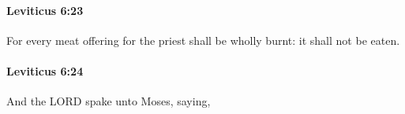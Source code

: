 		\paragraph{Leviticus 6:23} %
			\label{LEVITICUS-6-23}

			For every meat offering for the priest shall be wholly burnt: it shall not be eaten.


		\paragraph{Leviticus 6:24} %
			\label{LEVITICUS-6-24}

			And the LORD spake unto Moses, saying,


